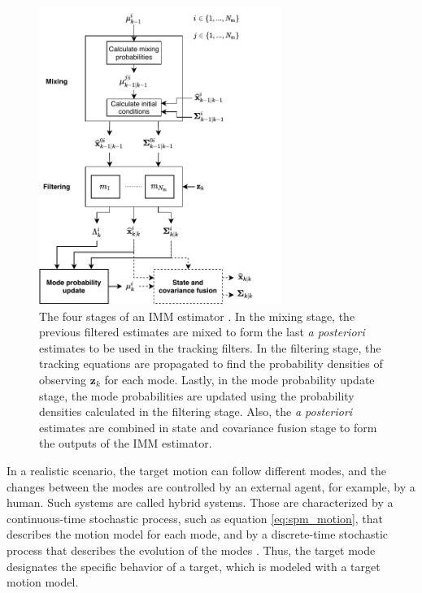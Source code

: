 \documentclass[english, 12pt, a4paper, elec, utf8, a-1b, online]{aaltothesis}
\numberwithin{equation}{section}
\renewcommand{\vec}[1]{\mathbf{#1}}
\newcommand{\z}{\vec{z}_k}
\def\post{\textit{a posteriori}}
\begin{document}
\begin{figure}[t]
    \centering
    \includegraphics[width=0.7\textwidth]{figures/IMM.pdf}
    \caption{
    The four stages of an IMM estimator \cite{BarShalom2001}.  In the mixing stage, the previous filtered estimates are mixed to form the last \post{} estimates to be used in the tracking filters. In the filtering stage, the tracking equations are propagated to find the probability densities of observing $\z$ for each mode. Lastly, in the mode probability update stage, the mode probabilities are updated using the probability densities calculated in the filtering stage. Also, the \post{} estimates are combined in state and covariance fusion stage to form the outputs of the IMM estimator.}
    \label{fig:IMM}
\end{figure}

In a realistic scenario, the target motion can follow different modes, and the changes between the modes are controlled by an external agent, for example, by a human.
Such systems are called hybrid systems. 
Those are characterized by a continuous-time stochastic process, such as equation \eqref{eq:spm_motion}, that describes the motion model for each mode, and by a discrete-time stochastic process that describes the evolution of the modes \cite{BarShalom2001}.
Thus, the target mode designates the specific behavior of a target, which is modeled with a target motion model.
\end{document}
